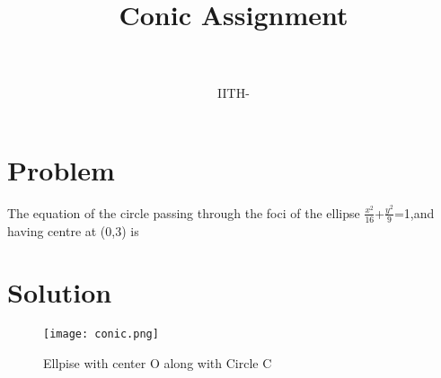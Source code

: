 \documentclass[journal,10pt,twocolumn]{article}
\title{Conic Assignment}
\date{}
\author{\myauthor\hspace{1em}\\\contact\\IITH\hspace{0.5em}-\hspace{0.5em}\mymodule}
\begin{document}
\maketitle
\section*{Problem}
The equation of the circle passing through the foci of the ellipse $\frac{x^2}{16}$+$\frac{y^2}{9}$=1,and having centre at (0,3) is
\section*{Solution}

\begin{figure}[h]
\centering
\texttt{[image: conic.png]}
\caption{Ellpise with center O along with Circle C}
\label{fig:Ellipse}
\end{figure}
\end{document}
